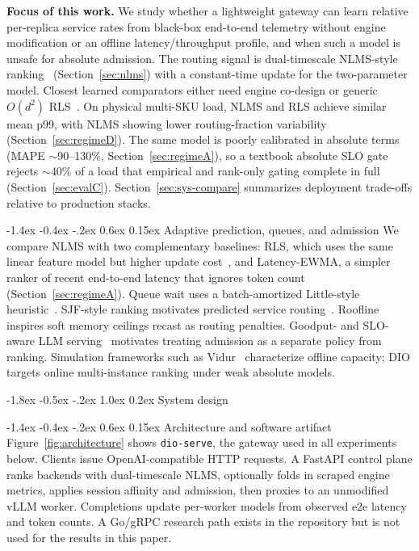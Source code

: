 \documentclass[pdflatex,sn-mathphys-num]{sn-jnl}
\makeatletter
\renewcommand{\section}{\@startsection{section}{1}{\z@}%
  {-1.8ex \@plus -0.5ex \@minus -.2ex}%
  {1.0ex \@plus 0.2ex}%
  {\normalfont\large\bfseries}}%
\renewcommand{\subsection}{\@startsection{subsection}{2}{\z@}%
  {-1.4ex \@plus -0.4ex \@minus -.2ex}%
  {0.6ex \@plus 0.15ex}%
  {\normalfont\normalsize\bfseries}}%
\makeatother
\begin{document}
\textbf{Focus of this work.}
We study whether a lightweight gateway can learn relative per-replica service rates
from black-box end-to-end telemetry without engine modification or an offline
latency/throughput profile, and when such a model is unsafe for absolute admission.
The routing signal is dual-timescale NLMS-style ranking~\cite{haykin2002adaptive}
(Section~\ref{sec:nlms}) with a constant-time update for the two-parameter model.
Closest learned comparators either need engine co-design or generic $O(d^2)$
RLS~\cite{nexussched}. On physical multi-SKU load, NLMS and RLS achieve similar mean
p99, with NLMS showing lower routing-fraction variability
(Section~\ref{sec:regimeD}). The same model is poorly calibrated in absolute terms
(MAPE $\sim$90--130\%, Section~\ref{sec:regimeA}), so a textbook absolute SLO gate
rejects $\sim$40\% of a load that empirical and rank-only gating complete in full
(Section~\ref{sec:evalC}). Section~\ref{sec:sys-compare} summarizes deployment
trade-offs relative to production stacks.

\subsection{Adaptive prediction, queues, and admission}
We compare NLMS with two complementary baselines: RLS, which uses the same linear
feature model but higher update cost~\cite{haykin2002adaptive,sayed2008adaptive},
and Latency-EWMA, a simpler ranker of recent end-to-end latency that ignores token
count (Section~\ref{sec:regimeA}). Queue wait uses a batch-amortized Little-style
heuristic~\cite{littleslaw,kleinrock1975queueing}. SJF-style ranking motivates
predicted service routing~\cite{sjf}. Roofline~\cite{williams2009roofline} inspires
soft memory ceilings recast as routing penalties. Goodput- and SLO-aware LLM
serving~\cite{distserve,sloawarellm} motivates treating admission as a
separate policy from ranking. Simulation frameworks such as Vidur~\cite{vidur}
characterize offline capacity; DIO targets online multi-instance ranking under weak
absolute models.

\section{System design}
\label{sec:design}

\subsection{Architecture and software artifact}
\label{sec:architecture}
Figure~\ref{fig:architecture} shows \texttt{dio-serve}, the gateway used in all
experiments below. Clients issue OpenAI-compatible HTTP requests. A FastAPI control
plane ranks backends with dual-timescale NLMS, optionally folds in scraped engine
metrics, applies session affinity and admission, then proxies to an unmodified vLLM
worker. Completions update per-worker models from observed e2e latency and token
counts. A Go/gRPC research path exists in the repository but is not used for the
results in this paper.
\end{document}
